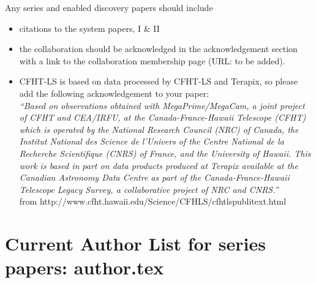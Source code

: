 \documentclass[a4paper]{article}
\begin{document}
Any \sw series and \sw enabled discovery papers should include
\begin{itemize}
\item citations to the \sw system papers, \sw I \& II
\item the collaboration should be acknowledged in the acknowledgement section with a link to the collaboration membership page (URL: to be added).
\item \sw CFHT-LS is based on data processed by CFHT-LS and Terapix, so please add the following acknowledgement to your paper:\\
\textit{``Based on observations obtained with MegaPrime/MegaCam, a joint project of CFHT and CEA/IRFU, at the Canada-France-Hawaii Telescope (CFHT) which is operated by the National Research Council (NRC) of Canada, the Institut National des Science de l'Univers of the Centre National de la Recherche Scientifique (CNRS) of France, and the University of Hawaii. This work is based in part on data products produced at Terapix available at the Canadian Astronomy Data Centre as part of the Canada-France-Hawaii Telescope Legacy Survey, a collaborative project of NRC and CNRS.''}\\
from http://www.cfht.hawaii.edu/Science/CFHLS/cfhtlspublitext.html

\end{itemize}


\appendix
\section{Current Author List for \sw series papers: author.tex}
\label{sec:appa}
{\small }

\end{document}
